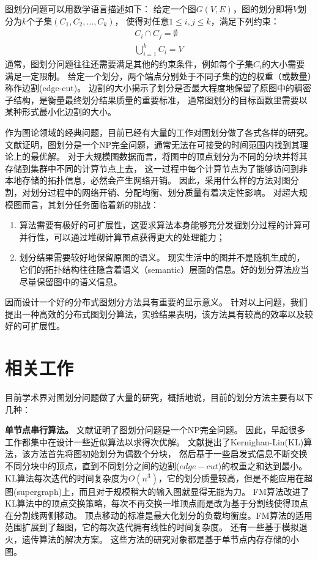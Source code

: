 \documentclass[master]{njuthesis}
\begin{document}
图划分问题可以用数学语言描述如下： 给定一个图$G(V, E)$，图的划分即将$V$划分为$k$个子集$(C_1, C_2, \dots, C_k)$，
使得对任意$1 \leq i,j \leq k$，满足下列约束：
\begin{equation}
\begin{aligned}
\label{eq:4-1}
 C_i \cap C_j=\emptyset \\
 \bigcup\limits_{i=1}^{k} C_{i} = V
 \end{aligned}
\end{equation}
通常，图划分问题往往还需要满足其他的约束条件，例如每个子集$C_i$的大小需要满足一定限制。
给定一个划分，两个端点分别处于不同子集的边的权重（或数量）称作边割(edge-cut)。
边割的大小揭示了划分是否最大程度地保留了原图中的稠密子结构，是衡量最终划分结果质量的重要标准，
通常图划分的目标函数里需要以某种形式最小化边割的大小。

作为图论领域的经典问题，目前已经有大量的工作对图划分做了各式各样的研究。 
文献\cite{garey1974somenp}证明，图划分是一个NP完全问题，通常无法在可接受的时间范围内找到其理论上的最优解。
对于大规模图数据而言，将图中的顶点划分为不同的分块并将其存储到集群中不同的计算节点上去，
这一过程中每个计算节点为了能够访问到非本地存储的拓扑信息，必然会产生网络开销。
因此，采用什么样的方法对图分割，对划分过程中的网络开销、分配均衡、划分质量有着决定性影响。
对超大规模图而言，其划分任务面临着新的挑战：
\begin{enumerate}
\item 算法需要有极好的可扩展性，这要求算法本身能够充分发掘划分过程的计算可并行性，可以通过堆砌计算节点获得更大的处理能力；

\item 划分结果需要较好地保留原图的语义。
现实生活中的图并不是随机生成的，它们的拓扑结构往往隐含着语义（semantic）层面的信息。好的划分算法应当尽量保留图中的语义信息。
\end{enumerate}

因而设计一个好的分布式图划分方法具有重要的显示意义。
针对以上问题，我们提出一种高效的分布式图划分算法，实验结果表明，该方法具有较高的效率以及较好的可扩展性。

\section{相关工作}
目前学术界对图划分问题做了大量的研究，概括地说，目前的划分方法主要有以下几种：

\textbf{单节点串行算法。 } 文献\cite{garey1974somenp}证明了图划分问题是一个NP完全问题。 
因此，早起很多工作都集中在设计一些近似算法以求得次优解。
文献\cite{kernighan1970efficient}提出了Kernighan-Lin(KL)算法，该方法首先将图初始划分为偶数个分块，
然后基于一些启发式信息不断交换不同分块中的顶点，直到不同划分之间的边割($edge-cut$)的权重之和达到最小。
KL算法每次迭代的时间复杂度为$O(n^3)$，它的划分质量较高，但是不能应用在超图(supergraph)上，而且对于规模稍大的输入图就显得无能为力。
FM算法\cite{fiduccia1988linear}改进了KL算法中的顶点交换策略，每次不再交换一堆顶点而是改为基于分割线使得顶点在分割线两侧移动。
顶点移动的标准是最大化划分的负载均衡度。FM算法的适用范围扩展到了超图，它的每次迭代拥有线性的时间复杂度。
还有一些基于模拟退火\cite{johnson1989optimization}，遗传算法\cite{bui1996genetic}的解决方案。
这些方法的研究对象都是基于单节点内存存储的小图。
\end{document}

